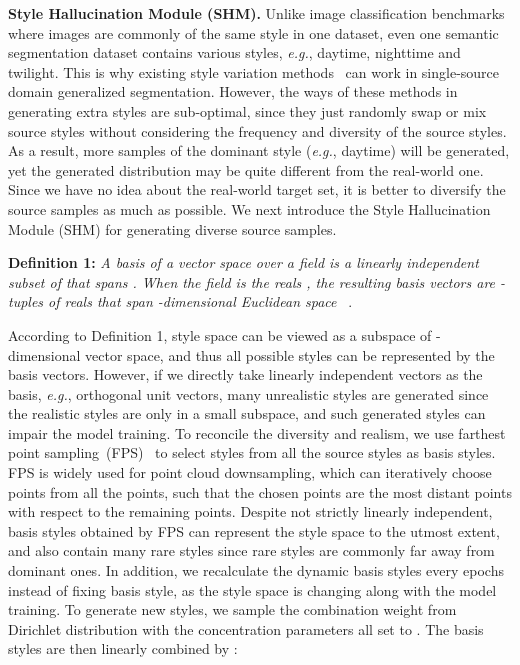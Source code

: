 \documentclass[runningheads]{llncs}
\def\eg{\emph{e.g.}} \def\Eg{\emph{E.g.}}
\begin{document}
\noindent\textbf{Style Hallucination Module (SHM).}
Unlike image classification benchmarks where images are commonly of the same style in one dataset, even one semantic segmentation dataset contains various styles, \eg, daytime, nighttime and twilight.
This is why existing style variation methods~\cite{crossnorm,zhou2021mixstyle} can work in single-source domain generalized segmentation.
However, the ways of these methods in generating extra styles are sub-optimal, since they just randomly swap or mix source styles without considering the frequency and diversity of the source styles. As a result, more samples of the dominant style (\eg, daytime) will be generated, yet the generated distribution may be quite different from the real-world one. 
Since we have no idea about the real-world target set, it is better to diversify the source samples as much as possible. We next introduce the Style Hallucination Module (SHM) for generating diverse source samples.


\noindent\textbf{Definition 1:} 
\textit{A basis  of a vector space  over a field  is a linearly independent subset of  that spans . When the field is the reals , the resulting basis vectors are -tuples of reals that span -dimensional Euclidean space }~\cite{basis}.

According to Definition 1, style space can be viewed as a subspace of -dimensional vector space, and thus all possible styles can be represented by the basis vectors.
However, if we directly take  linearly independent vectors as the basis, \eg, orthogonal unit vectors, many unrealistic styles are generated since the realistic styles are only in a small subspace, and such generated styles can impair the model training. 
To reconcile the diversity and realism, we use farthest point sampling~(FPS)~\cite{qi2017pointnet++} to select  styles from all the source styles as basis styles. 
FPS is widely used for point cloud downsampling, which can iteratively choose  points from all the points, such that the chosen points are the most distant points with respect to the remaining points.
Despite not strictly linearly independent, basis styles obtained by FPS can represent the style space to the utmost extent, and also contain many rare styles since rare styles are commonly far away from dominant ones. 
In addition, we recalculate the dynamic basis styles every  epochs instead of fixing basis style, as the style space is changing along with the model training. To generate new styles, we sample the combination weight  from Dirichlet distribution  with the concentration parameters  all set to . 
The basis styles are then linearly combined by :
\end{document}
